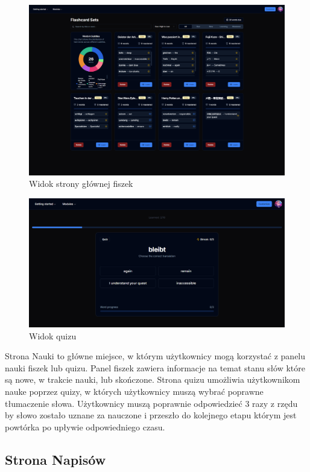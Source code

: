 \begin{figure}[H]
    \centering
    \includegraphics[width=1\textwidth]{IMAGE/FlashCards.png}
    \caption{Widok strony głównej fiszek}
    \label{fig:Strona głowna fiszek}
\end{figure}
\begin{figure}[H]
    \centering
    \includegraphics[width=1\textwidth]{IMAGE/Quiz.png}
    \caption{Widok quizu}
    \label{fig:Nauka z quizem}
\end{figure}
Strona Nauki to główne miejsce, w którym użytkownicy mogą korzystać z panelu nauki fiszek lub quizu. Panel fiszek zawiera informacje na temat stanu słów które są nowe, w trakcie nauki, lub skończone. Strona quizu umożliwia użytkownikom nauke poprzez quizy, w których użytkownicy muszą wybrać poprawne tłumaczenie słowa. Użytkownicy muszą poprawnie odpowiedzieć 3 razy z rzędu by słowo zostało uznane za nauczone i przeszło do kolejnego etapu którym jest powtórka po upływie odpowiedniego czasu.

\subsection{Strona Napisów}

